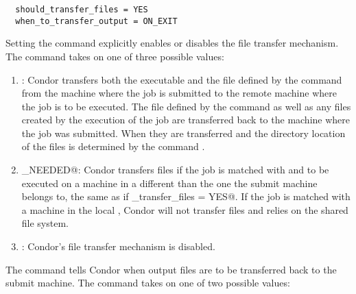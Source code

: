 \begin{verbatim}
  should_transfer_files = YES
  when_to_transfer_output = ON_EXIT
\end{verbatim}

Setting the  command explicitly
enables or disables the file transfer mechanism.
The command takes on one of three possible values:
\begin{enumerate}

\item \verb@YES@: Condor transfers both the executable and the file
defined by the  command from the machine where the job is
submitted to the remote machine where the job is to be executed.
The file defined by the  command as well as any files
created by the execution of the job are transferred back to the machine
where the job was submitted.
When they are transferred and the directory location of the files
is determined by the command .

\item \verb@IF_NEEDED@: Condor transfers files if the job is
matched with and to be executed on a machine in a
different  than the
one the submit machine belongs to, the same as if 
\verb@should_transfer_files = YES@.
If the job is matched with a machine in the local ,
Condor will not transfer files and relies
on the shared file system.

\item \verb@NO@: Condor's file transfer mechanism is disabled. 

\end{enumerate}

The  command tells Condor when output
files are to be transferred back to the submit machine.
The command takes on one of two possible values:

